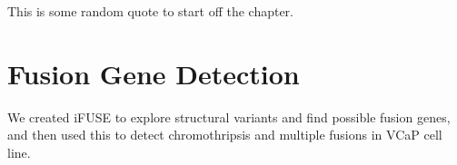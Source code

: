 \begin{savequote}[75mm]
This is some random quote to start off the chapter.
\end{savequote}

\chapter{Fusion Gene Detection}
\label{chapter:fusiongenes}
\setcounter{figure}{-1}
\setcounter{table}{-1}
\setcounter{section}{-1}

We created iFUSE to explore structural variants and find possible fusion genes, and then used this to detect chromothripsis and multiple fusions in VCaP cell line.

